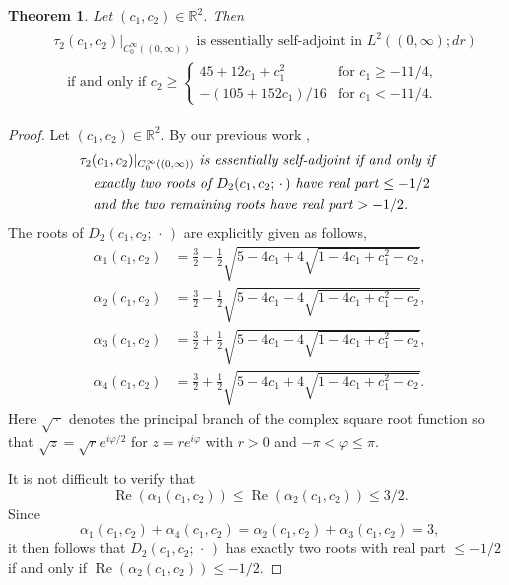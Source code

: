 \documentclass[reqno,11pt,centertags]{amsart}
\newcommand{\bbR}{{\mathbb{R}}}
\newcommand{\<}{\langle}
\renewcommand{\>}{\rangle}
\newcommand{\lb}{\label}
\newcommand{\dott}{\,\cdot\,}
\renewcommand{\Re}{\operatorname{Re}}
\numberwithin{equation}{section}
\newtheorem{theorem}{Theorem}[section]
\theoremstyle{definition}
\begin{document}
\begin{theorem} \lb{t2.2}
Let $(c_1,c_2)\in \bbR^2$. Then 
\begin{align} \lb{2.9}
\begin{split} 
& \text{$\tau_2(c_1,c_2)|_{C_0^{\infty}((0,\infty))}$ is essentially self-adjoint in $L^2((0,\infty);dr)$} \\
& \quad \text{if and only if }
c_2\geq 
\begin{cases}
45 + 12c_1 + c_1^2 & \mbox{for $c_1 \geq   -11/4$},   \\[10pt]
- (105 + 152 c_1)/16 & \mbox{for $c_1 <   -11/4$}.
\end{cases}
\end{split} 
\end{align} 
\end{theorem}
\begin{proof}
Let $(c_1,c_2)\in \bbR^2$.  By our previous work \cite[Remark~2.1]{GHT23},
\begin{align}
\begin{split} 
& \text{\it  $\tau_2(c_1,c_2)|_{C_0^{\infty}((0,\infty))}$ is essentially self-adjoint if and only if } \\
&  \quad \text{\it exactly two roots  of $D_2(c_1,c_2;\dott)$ have real part $\leq -1/2$}\\
& \quad \text{\it and the two remaining roots have real part $>-1/2$.}
\end{split} 
\end{align}
The roots of $D_2(c_1,c_2;\dott)$ are explicitly given as follows,  
\begin{align}
\alpha_1(c_1,c_2)&= \frac{3}{2}-\frac{1}{2}\sqrt{5-4 c_1+4 \sqrt{1 - 4 c_1 + c_1^2 - c_2}}, \lb{2.12} \\
\alpha_2(c_1,c_2)&= \frac{3}{2}-\frac{1}{2}\sqrt{5-4 c_1-4 \sqrt{1 - 4 c_1 + c_1^2 - c_2}} ,\\
\alpha_3(c_1,c_2)&= \frac{3}{2}+\frac{1}{2}\sqrt{5-4 c_1-4 \sqrt{1 - 4 c_1 + c_1^2 - c_2}} ,\\
\alpha_4(c_1,c_2)&=\frac{3}{2}+\frac{1}{2}\sqrt{5-4 c_1+4 \sqrt{1 - 4 c_1 + c_1^2 - c_2}} . \lb{2.15}
\end{align}
Here $\sqrt{\dott}$ denotes the principal branch of the complex square root function so that 
$\sqrt{z} = \sqrt{r}e^{i \varphi/2}$ for  $ z = r e^{i \varphi}$ with $r>0$ and  $-\pi<\varphi \leq \pi$. 

It is not difficult to verify that 
\begin{equation}
\Re(\alpha_1(c_1,c_2)) \leq \Re(\alpha_2(c_1,c_2)) \leq 3/2.
\end{equation}
Since 
\begin{equation} 
\alpha_1(c_1,c_2)+\alpha_4(c_1,c_2)=\alpha_2(c_1,c_2)+\alpha_3(c_1,c_2)=3, 
\end{equation} 
it then follows that $D_2(c_1,c_2;\dott)$ has exactly two roots with  real part $\leq -1/2$
if and only if $\Re(\alpha_2(c_1,c_2)) \leq -1/2$.  


\end{proof}
\end{document}

